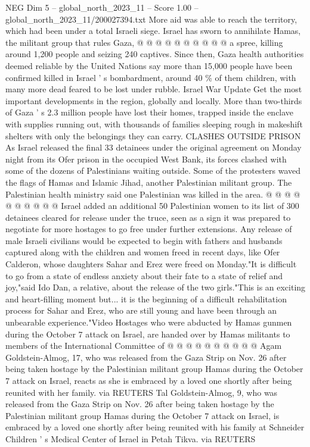\begin{textsample}{NEG Dim 5 – global\_north\_2023\_11 – Score 1.00 – global\_north\_2023\_11/200027394.txt}
More aid was able to reach the territory, which had been under a total Israeli siege.
Israel has sworn to annihilate Hamas, the militant group that rules Gaza, @ @ @ @ @ @ @ @ @ @ a spree, killing around 1,200 people and seizing 240 captives.
Since then, Gaza health authorities deemed reliable by the United Nations say more than 15,000 people have been confirmed killed in Israel ' s bombardment, around 40 \% of them children, with many more dead feared to be lost under rubble.
Israel War Update Get the most important developments in the region, globally and locally.
More than two-thirds of Gaza ' s 2.3 million people have lost their homes, trapped inside the enclave with supplies running out, with thousands of families sleeping rough in makeshift shelters with only the belongings they can carry.
CLASHES OUTSIDE PRISON As Israel released the final 33 detainees under the original agreement on Monday night from its Ofer prison in the occupied West Bank, its forces clashed with some of the dozens of Palestinians waiting outside.
Some of the protesters waved the flags of Hamas and Islamic Jihad, another Palestinian militant group.
The Palestinian health ministry said one Palestinian was killed in the area. @ @ @ @ @ @ @ @ @ @ Israel added an additional 50 Palestinian women to its list of 300 detainees cleared for release under the truce, seen as a sign it was prepared to negotiate for more hostages to go free under further extensions.
Any release of male Israeli civilians would be expected to begin with fathers and husbands captured along with the children and women freed in recent days, like Ofer Calderon, whose daughters Sahar and Erez were freed on Monday."It is difficult to go from a state of endless anxiety about their fate to a state of relief and joy,"said Ido Dan, a relative, about the release of the two girls."This is an exciting and heart-filling moment but... it is the beginning of a difficult rehabilitation process for Sahar and Erez, who are still young and have been through an unbearable experience."Video Hostages who were abducted by Hamas gunmen during the October 7 attack on Israel, are handed over by Hamas militants to members of the International Committee of @ @ @ @ @ @ @ @ @ @ Agam Goldstein-Almog, 17, who was released from the Gaza Strip on Nov. 26 after being taken hostage by the Palestinian militant group Hamas during the October 7 attack on Israel, reacts as she is embraced by a loved one shortly after being reunited with her family. via REUTERS Tal Goldstein-Almog, 9, who was released from the Gaza Strip on Nov. 26 after being taken hostage by the Palestinian militant group Hamas during the October 7 attack on Israel, is embraced by a loved one shortly after being reunited with his family at Schneider Children ' s Medical Center of Israel in Petah Tikva. via REUTERS

\end{textsample}
